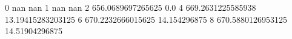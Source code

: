 0 nan nan
1 nan nan
2 656.0689697265625 0.0
4 669.2631225585938 13.19415283203125
6 670.2232666015625 14.154296875
8 670.5880126953125 14.51904296875

